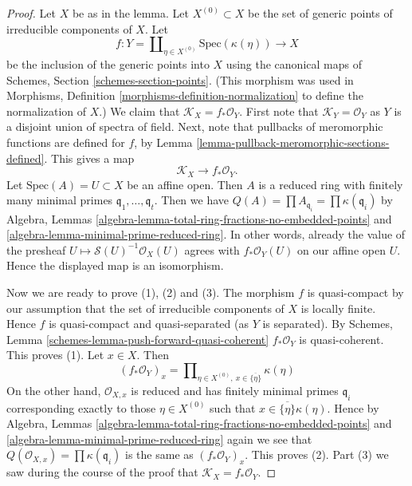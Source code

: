 \begin{proof}
Let $X$ be as in the lemma. Let $X^{(0)} \subset X$ be the
set of generic points of irreducible components of $X$. Let
$$
f :
Y = \coprod\nolimits_{\eta \in X^{(0)}} \text{Spec}(\kappa(\eta))
\longrightarrow
X
$$
be the inclusion of the generic points into $X$ using the
canonical maps of Schemes, Section \ref{schemes-section-points}.
(This morphism was used in
Morphisms, Definition \ref{morphisms-definition-normalization}
to define the normalization of $X$.)
We claim that $\mathcal{K}_X = f_*\mathcal{O}_Y$.
First note that $\mathcal{K}_Y = \mathcal{O}_Y$ as $Y$ is a disjoint
union of spectra of field. Next, note that pullbacks of meromorphic
functions are defined for $f$, by
Lemma \ref{lemma-pullback-meromorphic-sections-defined}.
This gives a map
$$
\mathcal{K}_X \longrightarrow f_*\mathcal{O}_Y.
$$
Let $\text{Spec}(A) = U \subset X$ be an affine open.
Then $A$ is a reduced ring with finitely many minimal
primes $\mathfrak q_1, \ldots, \mathfrak q_t$. Then we have
$Q(A) = \prod A_{\mathfrak q_i} = \prod \kappa(\mathfrak q_i)$
by Algebra, Lemmas \ref{algebra-lemma-total-ring-fractions-no-embedded-points}
and \ref{algebra-lemma-minimal-prime-reduced-ring}.
In other words, already the value of the presheaf
$U \mapsto \mathcal{S}(U)^{-1}\mathcal{O}_X(U)$ agrees with
$f_*\mathcal{O}_Y(U)$ on our affine open $U$. Hence the displayed
map is an isomorphism.

\medskip\noindent
Now we are ready to prove (1), (2) and (3).
The morphism $f$ is quasi-compact by our assumption
that the set of irreducible components of $X$ is locally finite.
Hence $f$ is quasi-compact and quasi-separated (as $Y$ is separated).
By Schemes, Lemma \ref{schemes-lemma-push-forward-quasi-coherent}
$f_*\mathcal{O}_Y$ is quasi-coherent.
This proves (1). Let $x \in X$. Then
$$
(f_*\mathcal{O}_Y)_x
=
\prod\nolimits_{\eta \in X^{(0)},\ x \in \overline{\{\eta\}}} \kappa(\eta)
$$
On the other hand, $\mathcal{O}_{X, x}$
is reduced and has finitely minimal primes $\mathfrak q_i$ corresponding
exactly to those $\eta \in X^{(0)}$ such that
$x \in \overline{\{\eta\}} \kappa(\eta)$. Hence by
Algebra, Lemmas \ref{algebra-lemma-total-ring-fractions-no-embedded-points}
and \ref{algebra-lemma-minimal-prime-reduced-ring} again
we see that
$Q(\mathcal{O}_{X, x}) = \prod \kappa(\mathfrak q_i)$ is the
same as $(f_*\mathcal{O}_Y)_x$. This proves (2).
Part (3) we saw during the course of the proof that
$\mathcal{K}_X = f_*\mathcal{O}_Y$.
\end{proof}

